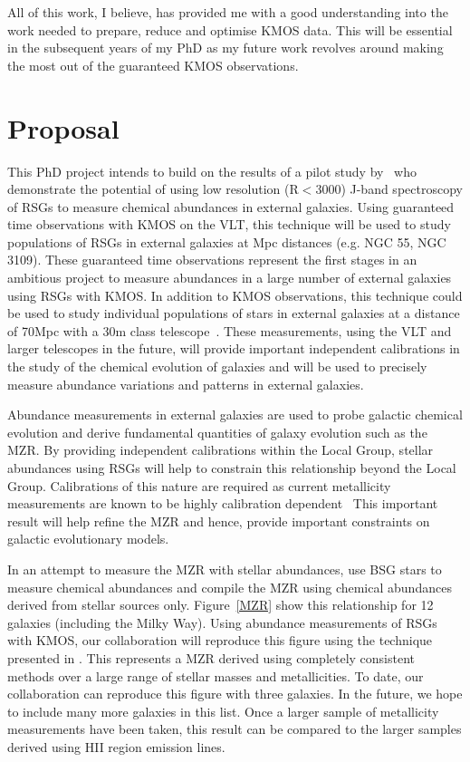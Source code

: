 \documentclass[a4paper,12pt]{article}
\begin{document}
All of this work, I believe, has provided me with a good understanding into the work needed to prepare, reduce and optimise KMOS data.
This will be essential in the subsequent years of my PhD as my future work revolves around making the most out of the guaranteed KMOS observations.  


\section{Proposal}

This PhD project intends to build on the results of a pilot study by~\cite{Davies10, Davies13a} who demonstrate the potential of using low resolution (R$<$3000) J-band spectroscopy of RSGs to measure chemical abundances in external galaxies. 
Using guaranteed time observations with KMOS on the VLT, this technique will be used to study populations of RSGs in external galaxies at Mpc distances (e.g. NGC 55, NGC 3109). 
These guaranteed time observations represent the first stages in an ambitious project to measure abundances in a large number of external galaxies using RSGs with KMOS.
In addition to KMOS observations, this technique could be used to study individual populations of stars in external galaxies at a distance of 70Mpc with a 30m class telescope~\citep{Evans11}. 
These measurements, using the VLT and larger telescopes in the future, will provide important independent calibrations in the study of the chemical evolution of galaxies and will be used to precisely measure abundance variations and patterns in external galaxies. 

Abundance measurements in external galaxies are used to probe galactic chemical evolution and derive fundamental quantities of galaxy evolution such as the MZR. 
By providing independent calibrations within the Local Group, stellar abundances using RSGs will help to constrain this relationship beyond the Local Group.
Calibrations of this nature are required as current metallicity measurements are known to be highly calibration dependent~\citep{Kewley08,Kudritzki08, Bresolin09}
This important result will help refine the MZR and hence, provide important constraints on galactic evolutionary models. 

In an attempt to measure the MZR with stellar abundances, \cite{Kudritzki12} use BSG stars to measure chemical abundances and compile the MZR using chemical abundances derived from stellar sources only.
Figure~\ref{MZR} show this relationship for 12 galaxies (including the Milky Way). 
Using abundance measurements of RSGs with KMOS, our collaboration will reproduce this figure using the technique presented in \citep{Davies10,Davies13a}. 
This represents a MZR derived using completely consistent methods over a large range of stellar masses and metallicities. 
To date, our collaboration can reproduce this figure with three galaxies. 
In the future, we hope to include many more galaxies in this list. 
Once a larger sample of metallicity measurements have been taken, this result can be compared to the larger samples derived using HII region emission lines. 
\end{document}
